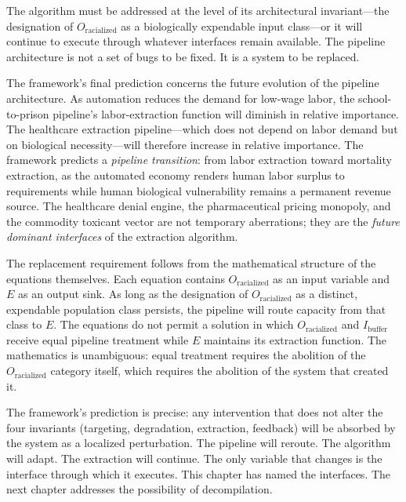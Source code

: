 The algorithm must be addressed at the level of its architectural invariant---the designation of $O_{\text{racialized}}$ as a biologically expendable input class---or it will continue to execute through whatever interfaces remain available. The pipeline architecture is not a set of bugs to be fixed. It is a system to be replaced.

The framework's final prediction concerns the future evolution of the pipeline architecture. As automation reduces the demand for low-wage labor, the school-to-prison pipeline's labor-extraction function will diminish in relative importance. The healthcare extraction pipeline---which does not depend on labor demand but on biological necessity---will therefore increase in relative importance. The framework predicts a \textit{pipeline transition}: from labor extraction toward mortality extraction, as the automated economy renders human labor surplus to requirements while human biological vulnerability remains a permanent revenue source. The healthcare denial engine, the pharmaceutical pricing monopoly, and the commodity toxicant vector are not temporary aberrations; they are the \textit{future dominant interfaces} of the extraction algorithm.

The replacement requirement follows from the mathematical structure of the equations themselves. Each equation contains $O_{\text{racialized}}$ as an input variable and $E$ as an output sink. As long as the designation of $O_{\text{racialized}}$ as a distinct, expendable population class persists, the pipeline will route capacity from that class to $E$. The equations do not permit a solution in which $O_{\text{racialized}}$ and $I_{\text{buffer}}$ receive equal pipeline treatment while $E$ maintains its extraction function. The mathematics is unambiguous: equal treatment requires the abolition of the $O_{\text{racialized}}$ category itself, which requires the abolition of the system that created it.

The framework's prediction is precise: any intervention that does not alter the four invariants (targeting, degradation, extraction, feedback) will be absorbed by the system as a localized perturbation. The pipeline will reroute. The algorithm will adapt. The extraction will continue. The only variable that changes is the interface through which it executes. This chapter has named the interfaces. The next chapter addresses the possibility of decompilation.

